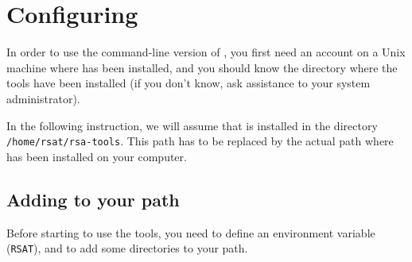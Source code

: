 \section{Configuring \RSAT}


In order to use the command-line version of \RSAT, you first need an
account on a Unix machine where \RSAT has been installed, and you
should know the directory where the tools have been installed (if you
don't know, ask assistance to your system administrator).

In the following instruction, we will assume that \RSAT is installed
in the directory \texttt{/home/rsat/rsa-tools}. This path has to be
replaced by the actual path where \RSAT has been installed on your
computer.

\subsection{Adding \RSAT  to your path}

Before starting to use the tools, you need to define an environment
variable (\texttt{RSAT}), and to add some directories to your path.

